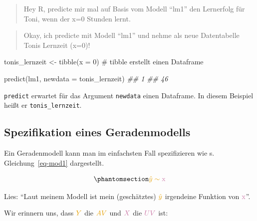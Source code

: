 \documentclass[
  letterpaper,
  twoside,
  open=any]{scrbook}
\newenvironment{Shaded}{\begin{snugshade}}{\end{snugshade}}
\newcommand{\AttributeTok}[1]{\textcolor[rgb]{0.40,0.45,0.13}{#1}}
\newcommand{\CommentTok}[1]{\textcolor[rgb]{0.37,0.37,0.37}{#1}}
\newcommand{\DecValTok}[1]{\textcolor[rgb]{0.68,0.00,0.00}{#1}}
\newcommand{\DocumentationTok}[1]{\textcolor[rgb]{0.37,0.37,0.37}{\textit{#1}}}
\newcommand{\FunctionTok}[1]{\textcolor[rgb]{0.28,0.35,0.67}{#1}}
\newcommand{\NormalTok}[1]{\textcolor[rgb]{0.00,0.23,0.31}{#1}}
\newcommand{\OtherTok}[1]{\textcolor[rgb]{0.00,0.23,0.31}{#1}}
\theoremstyle{definition}
\theoremstyle{definition}
\theoremstyle{definition}
\theoremstyle{remark}
\begin{document}
\begin{quote}
{} Hey R, predicte mir mal auf Basis vom Modell
\enquote{lm1} den Lernerfolg für Toni, wenn der x=0 Stunden lernt.
\end{quote}

\begin{quote}
{} Okay, ich predicte mit Modell \enquote{lm1} und nehme
als neue Datentabelle Tonis Lernzeit (x=0)!
\end{quote}

\begin{Shaded}
\begin{Highlighting}[]
\NormalTok{tonis\_lernzeit }\OtherTok{\textless{}{-}} \FunctionTok{tibble}\NormalTok{(}\AttributeTok{x =} \DecValTok{0}\NormalTok{)  }\CommentTok{\# \textasciigrave{}tibble\textasciigrave{} erstellt einen Dataframe}
\end{Highlighting}
\end{Shaded}

\begin{Shaded}
\begin{Highlighting}[]
\FunctionTok{predict}\NormalTok{(lm1, }\AttributeTok{newdata =}\NormalTok{ tonis\_lernzeit)}
\DocumentationTok{\#\#  1 }
\DocumentationTok{\#\# 46}
\end{Highlighting}
\end{Shaded}

\texttt{predict} erwartet für das Argument \texttt{newdata} einen
Dataframe. In diesem Beispiel heißt er \texttt{tonis\_lernzeit}.

\subsection{Spezifikation eines
Geradenmodells}\label{spezifikation-eines-geradenmodells}

Ein Geradenmodell kann man im einfachsten Fall spezifizieren wie s.
Gleichung~\ref{eq-mod1} dargestellt.

\begin{equation}\phantomsection\label{eq-mod1}{\color{ycol}{\hat{y}} \sim \color{xcol}{\text{x}}}\end{equation}

Lies: \enquote{Laut meinem Modell ist mein (geschätztes)
\(\color{ycol}{\hat{y}}\) irgendeine Funktion von
\(\color{xcol}{\text{x}}\)}.

Wir erinnern uns, dass \(\color{ycol}{Y}\) die \(\color{ycol}{AV}\) und
\(\color{xcol}{X}\) die \(\color{xcol}{UV}\) ist:
\end{document}
